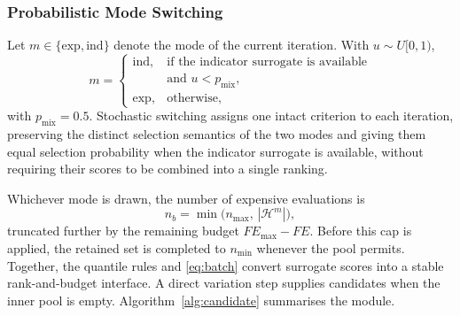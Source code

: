 \documentclass[final,5p,times,twocolumn]{elsarticle}
\begin{document}
\subsubsection{Probabilistic Mode Switching}
\label{sec:method:candidate:mix}

Let $m\in\{\mathrm{exp},\mathrm{ind}\}$ denote the mode of the current
iteration. With $u\sim U[0,1)$,
\begin{equation}
m=
\begin{cases}
\mathrm{ind}, & \text{if the indicator surrogate is available}\\
              & \text{and } u<p_{\mathrm{mix}},\\[2pt]
\mathrm{exp}, & \text{otherwise},
\end{cases}
\label{eq:mode}
\end{equation}
with $p_{\mathrm{mix}}=0.5$. Stochastic switching assigns one intact criterion
to each iteration, preserving the distinct selection semantics of the two modes
and giving them equal selection probability when the indicator surrogate is
available, without requiring their scores to be combined into a single ranking.

Whichever mode is drawn, the number of expensive evaluations is
\begin{equation}
n_b=\min\bigl(n_{\max},\,|\mathcal{H}^{m}|\bigr),
\label{eq:batch}
\end{equation}
truncated further by the remaining budget $FE_{\max}-FE$. Before this cap is
applied, the retained set is completed to $n_{\min}$ whenever the pool permits.
Together, the quantile rules and \eqref{eq:batch} convert surrogate scores into
a stable rank-and-budget interface. A direct variation step supplies candidates
when the inner pool is empty. Algorithm~\ref{alg:candidate} summarises the
module.
\end{document}
